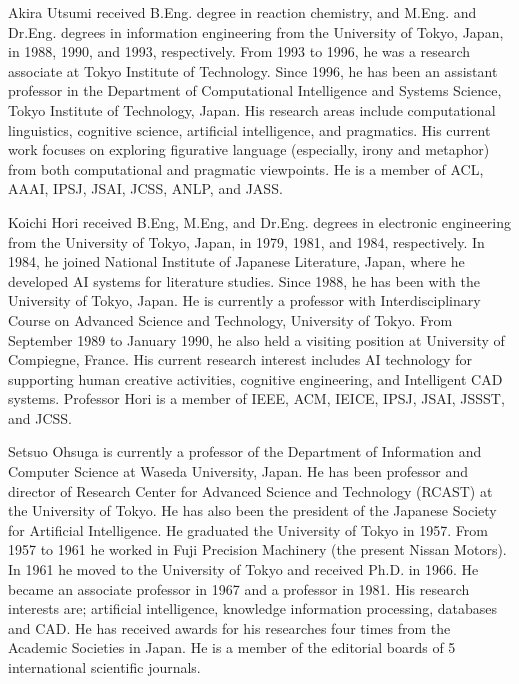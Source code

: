 \begin{biography}

\biotitle{}

{
Akira Utsumi received B.Eng. degree in reaction chemistry,
and M.Eng. and Dr.Eng. degrees in information engineering 
from the University of Tokyo, Japan, in 1988, 1990, and 1993, respectively.
From 1993 to 1996, he was a research associate at Tokyo Institute of Technology.
Since 1996, he has been an assistant professor in the Department of
Computational Intelligence and Systems Science, Tokyo Institute of Technology, Japan.
His research areas include 
computational linguistics, cognitive science,
artificial intelligence, and pragmatics.
His current work focuses on exploring figurative language 
(especially, irony and metaphor) from both computational and pragmatic viewpoints.
He is a member of ACL, AAAI, IPSJ, JSAI, JCSS, ANLP, and JASS.
}

{
Koichi Hori received B.Eng, M.Eng, and
Dr.Eng. degrees in electronic engineering from the University of
Tokyo, Japan, in 1979, 1981, and 1984, respectively.
In 1984, he joined National Institute of Japanese Literature, Japan,
where he developed AI systems for literature studies. Since 1988, he
has been with the University of Tokyo, Japan. He is currently 
a professor with Interdisciplinary Course on Advanced
Science and Technology, University of Tokyo.
From September 1989 to January 1990, he also held a visiting position
at University of Compiegne, France. His current research interest
includes AI technology for supporting human creative activities,
cognitive engineering, and Intelligent CAD systems.
Professor Hori is a member of IEEE, ACM, IEICE, IPSJ, JSAI, JSSST, and
JCSS.}

{
Setsuo Ohsuga is currently a professor of the Department of Information
and Computer Science at Waseda University, Japan.
He has been professor and director of Research Center for Advanced
Science and Technology (RCAST) at the University of Tokyo.
He has also been the president of the Japanese Society for
Artificial Intelligence. He graduated the University of Tokyo in 1957.
From 1957 to 1961 he worked in Fuji Precision Machinery (the present
Nissan Motors). In 1961 he moved to the University of Tokyo and
received Ph.D. in 1966. He became an associate professor in 1967 and 
a professor in 1981. 
His research interests are; artificial intelligence, knowledge information
processing, databases and CAD.
He has received awards for his researches four times from the
Academic Societies in Japan. He is a member of the editorial boards
of 5 international scientific journals.}

\end{biography}


